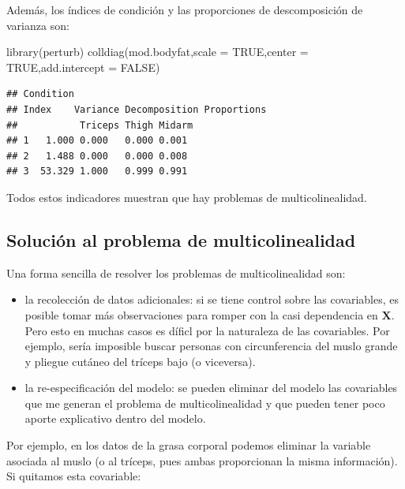 \documentclass[
]{article}
\newenvironment{Shaded}{\begin{snugshade}}{\end{snugshade}}
\newcommand{\AttributeTok}[1]{\textcolor[rgb]{0.77,0.63,0.00}{#1}}
\newcommand{\ConstantTok}[1]{\textcolor[rgb]{0.00,0.00,0.00}{#1}}
\newcommand{\FunctionTok}[1]{\textcolor[rgb]{0.00,0.00,0.00}{#1}}
\newcommand{\NormalTok}[1]{#1}
\begin{document}
Además, los índices de condición y las proporciones de descomposición de varianza son:

\begin{Shaded}
\begin{Highlighting}[]
\FunctionTok{library}\NormalTok{(perturb)}
\FunctionTok{colldiag}\NormalTok{(mod.bodyfat,}\AttributeTok{scale =} \ConstantTok{TRUE}\NormalTok{,}\AttributeTok{center =} \ConstantTok{TRUE}\NormalTok{,}\AttributeTok{add.intercept =} \ConstantTok{FALSE}\NormalTok{)}
\end{Highlighting}
\end{Shaded}

\begin{verbatim}
## Condition
## Index    Variance Decomposition Proportions
##           Triceps Thigh Midarm
## 1   1.000 0.000   0.000 0.001 
## 2   1.488 0.000   0.000 0.008 
## 3  53.329 1.000   0.999 0.991
\end{verbatim}

Todos estos indicadores muestran que hay problemas de multicolinealidad.

\hypertarget{soluciuxf3n-al-problema-de-multicolinealidad}{%
\subsection{Solución al problema de multicolinealidad}\label{soluciuxf3n-al-problema-de-multicolinealidad}}

Una forma sencilla de resolver los problemas de multicolinealidad son:

\begin{itemize}
\item
  la recolección de datos adicionales: si se tiene control sobre las covariables, es posible tomar más observaciones para romper con la casi dependencia en \(\boldsymbol X\). Pero esto en muchas casos es díficl por la naturaleza de las covariables. Por ejemplo, sería imposible buscar personas con circunferencia del muslo grande y pliegue cutáneo del tríceps bajo (o viceversa).
\item
  la re-especificación del modelo: se pueden eliminar del modelo las covariables que me generan el problema de multicolinealidad y que pueden tener poco aporte explicativo dentro del modelo.
\end{itemize}

Por ejemplo, en los datos de la grasa corporal podemos eliminar la variable asociada al muslo (o al tríceps, pues ambas proporcionan la misma información). Si quitamos esta covariable:
\end{document}
